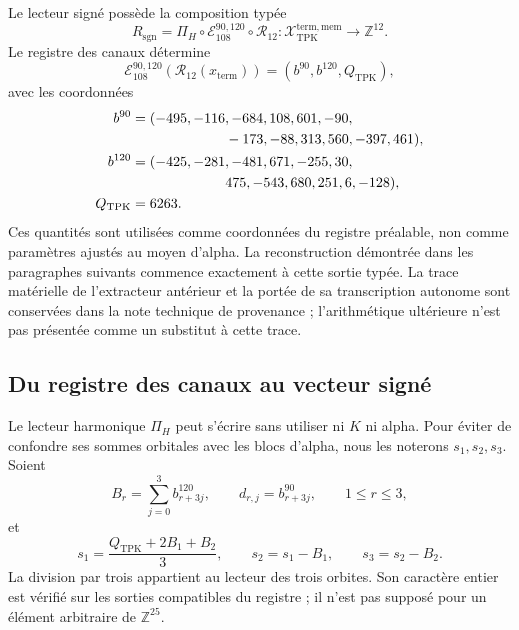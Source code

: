 Le lecteur signé possède la composition typée
\begin{equation}
 R_{\mathrm{sgn}}
 =\Pi_H\circ\mathcal E_{108}^{90,120}\circ\mathcal R_{12}:
 \mathcal X_{\mathrm{TPK}}^{\mathrm{term,mem}}
 \longrightarrow\mathbb Z^{12}.
 \label{eq:k-lector-firmado}
\end{equation}
Le registre des canaux détermine
\[
 \mathcal E_{108}^{90,120}(\mathcal R_{12}(x_{\mathrm{term}}))
 =(b^{90},b^{120},Q_{\mathrm{TPK}}),
\]
avec les coordonnées
\begin{align*}
 b^{90}={}&(-495,-116,-684,108,601,-90,\\
            &\hspace{19mm}-173,-88,313,560,-397,461),\\
 b^{120}={}&(-425,-281,-481,671,-255,30,\\
             &\hspace{19mm}475,-543,680,251,6,-128),\\
 Q_{\mathrm{TPK}}={}&6263.
\end{align*}
Ces quantités sont utilisées comme coordonnées du registre préalable, non
comme paramètres ajustés au moyen d’alpha. La reconstruction démontrée
dans les paragraphes suivants commence exactement à cette sortie typée.
La trace matérielle de l’extracteur antérieur et la portée de sa transcription
autonome sont conservées dans la note technique de provenance ; l’arithmétique
ultérieure n’est pas présentée comme un substitut à cette trace.

\subsection{Du registre des canaux au vecteur signé}
\label{subsec:k-pi-h}

Le lecteur harmonique \(\Pi_H\) peut s'écrire sans utiliser ni \(K\) ni
alpha. Pour éviter de confondre ses sommes orbitales avec les blocs d'alpha,
nous les noterons \(s_1,s_2,s_3\). Soient
\[
 B_r=\sum_{j=0}^{3}b^{120}_{r+3j},\qquad
 d_{r,j}=b^{90}_{r+3j},\qquad1\leq r\leq3,
\]
et
\begin{equation}
 s_1=\frac{Q_{\mathrm{TPK}}+2B_1+B_2}{3},\qquad
 s_2=s_1-B_1,\qquad s_3=s_2-B_2.
 \label{eq:k-sumas-armonicas}
\end{equation}
La division par trois appartient au lecteur des trois orbites. Son caractère entier est vérifié sur les sorties compatibles du registre ; il n'est pas supposé pour un élément arbitraire de \(\mathbb Z^{25}\).

